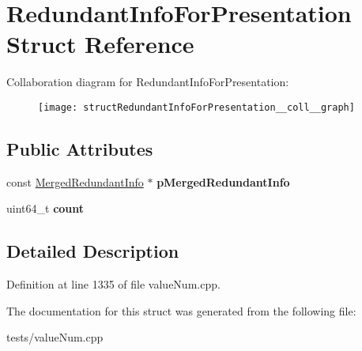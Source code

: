 \hypertarget{structRedundantInfoForPresentation}{\section{Redundant\-Info\-For\-Presentation Struct Reference}
\label{structRedundantInfoForPresentation}
}


Collaboration diagram for Redundant\-Info\-For\-Presentation\-:
\nopagebreak
\begin{figure}[H]
\begin{center}
\leavevmode
\texttt{[image: structRedundantInfoForPresentation\_\_coll\_\_graph]}
\end{center}
\end{figure}
\subsection*{Public Attributes}
\begin{DoxyCompactItemize}
\item 
\hypertarget{structRedundantInfoForPresentation_aee93cc1e1742c5245983669816880a81}{const \hyperlink{structMergedRedundantInfo}{Merged\-Redundant\-Info} $\ast$ {\bfseries p\-Merged\-Redundant\-Info}}\label{structRedundantInfoForPresentation_aee93cc1e1742c5245983669816880a81}

\item 
\hypertarget{structRedundantInfoForPresentation_acf63bf4fe95e235880ad949ee87756ce}{uint64\-\_\-t {\bfseries count}}\label{structRedundantInfoForPresentation_acf63bf4fe95e235880ad949ee87756ce}

\end{DoxyCompactItemize}


\subsection{Detailed Description}


Definition at line 1335 of file value\-Num.\-cpp.



The documentation for this struct was generated from the following file\-:\begin{DoxyCompactItemize}
\item 
tests/value\-Num.\-cpp\end{DoxyCompactItemize}
